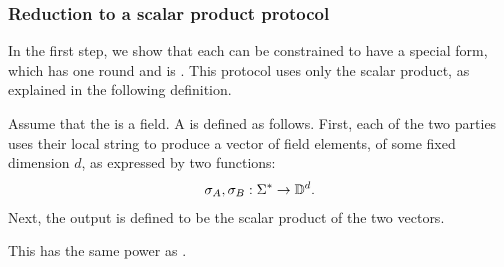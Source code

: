 \subsubsection{Reduction to a scalar product protocol}
\label{sec:reduction-to-scalar-product-protocols}
\AP
In the first step, we show that each  can be constrained to have a
special form, which has one round and is . This protocol uses only
the scalar product,  as explained in the following definition. 

\begin{definition} \label{def:scalar-product-protocol}
    Assume that the  is a field.
    A  is defined as follows.
    First, each of the two parties uses their local string to 
    produce a vector of field elements, 
    of some fixed dimension $d$, as expressed by two functions: 
    \begin{align*}
    \sigma_A, \sigma_B : \Sigma^* \to \mathbb D^d.
    \end{align*}
    Next, the output is defined to be the scalar product of the two vectors. 
\end{definition}

This  has the same power as .

